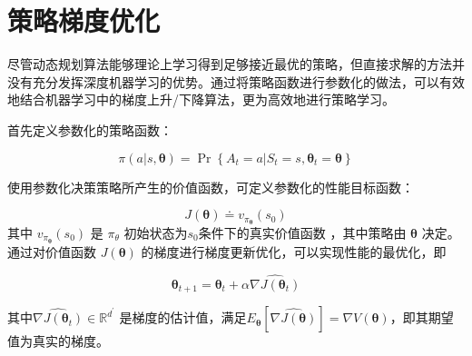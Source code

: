 




\section{策略梯度优化}

尽管动态规划算法能够理论上学习得到足够接近最优的策略，但直接求解的方法并没有充分发挥深度机器学习的优势。通过将策略函数进行参数化的做法，可以有效地结合机器学习中的梯度上升/下降算法，更为高效地进行策略学习。

首先定义参数化的策略函数：

\begin{equation}
\pi ( a | s , \boldsymbol { \theta } ) = \operatorname { Pr } \left\{ A _ { t } = a | S _ { t } = s , \boldsymbol { \theta } _ { t } = \boldsymbol { \theta } \right\}
\end{equation}

使用参数化决策策略所产生的价值函数，可定义参数化的性能目标函数：

\begin{equation}
    J(\boldsymbol{\theta}) \doteq v_{\pi_{\boldsymbol{\theta}}}\left(s_{0}\right)
\end{equation}
其中 $v_{\pi_{\boldsymbol{\theta}}}\left(s_{0}\right)$ 是 $\pi_\theta$ 初始状态为$s_0$条件下的真实价值函数 ，其中策略由 $\boldsymbol{\theta}$ 决定。通过对价值函数 $J ( \boldsymbol { \theta } )$ 的梯度进行梯度更新优化，可以实现性能的最优化，即

\begin{equation}
\boldsymbol { \theta } _ { t + 1 } = \boldsymbol { \theta } _ { t } + \alpha \widehat { \nabla J \left( \boldsymbol { \theta } _ { t } \right) }
\end{equation}

其中$\widehat { \nabla J \left( \boldsymbol { \theta } _ { t } \right) } \in \mathbb { R } ^ { d ^ { \prime } }$ 是梯度的估计值，满足$E_\boldsymbol{\theta}\left[\widehat { \nabla J \left( \boldsymbol { \theta } \right) }\right]=\nabla V(\boldsymbol{\theta})$，即其期望值为真实的梯度。


